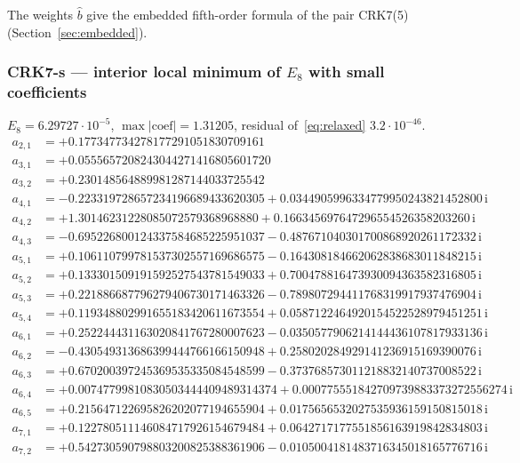 The weights $\hat b$ give the embedded fifth-order formula of the pair CRK7(5) (Section~\ref{sec:embedded}).
\subsubsection*{CRK7-s --- interior local minimum of $E_8$ with small coefficients}
$E_{8}=6.29727\cdot10^{-5}$, $\max|\text{coef}|=1.31205$, residual of~\eqref{eq:relaxed} $3.2\cdot10^{-46}$.
{\small\allowdisplaybreaks
\begin{align*}
a_{2,1} &= +0.177347734278177291051830709161\\
a_{3,1} &= +0.0555657208243044271416805601720\\
a_{3,2} &= +0.230148564889981287144033725542\\
a_{4,1} &= -0.223319728657234196689433620305 + 0.0344905996334779950243821452800\,\mathrm{i}\\
a_{4,2} &= +1.30146231228085072579368968880 + 0.166345697647296554526358203260\,\mathrm{i}\\
a_{4,3} &= -0.695226800124337584685225951037 - 0.487671040301700868920261172332\,\mathrm{i}\\
a_{5,1} &= +0.106110799781537302557169686575 - 0.164308184662062838683011848215\,\mathrm{i}\\
a_{5,2} &= +0.133301509191592527543781549033 + 0.700478816473930094363582316805\,\mathrm{i}\\
a_{5,3} &= +0.221886687796279406730171463326 - 0.789807294411768319917937476904\,\mathrm{i}\\
a_{5,4} &= +0.119348802991655183420611673554 + 0.0587122464920154522528979451251\,\mathrm{i}\\
a_{6,1} &= +0.252244431163020841767280007623 - 0.0350577906214144436107817933136\,\mathrm{i}\\
a_{6,2} &= -0.430549313686399444766166150948 + 0.258020284929141236915169390076\,\mathrm{i}\\
a_{6,3} &= +0.670200397245369535335084548599 - 0.373768573011218832140737008522\,\mathrm{i}\\
a_{6,4} &= +0.00747799810830503444409489314374 + 0.000775551842709739883373272556274\,\mathrm{i}\\
a_{6,5} &= +0.215647122695826202077194655904 + 0.0175656532027535936159150815018\,\mathrm{i}\\
a_{7,1} &= +0.122780511146084717926154679484 + 0.0642717177551856163919842834803\,\mathrm{i}\\
a_{7,2} &= +0.542730590798803200825388361906 - 0.0105004181483716345018165776716\,\mathrm{i}\\

\end{align*}}
